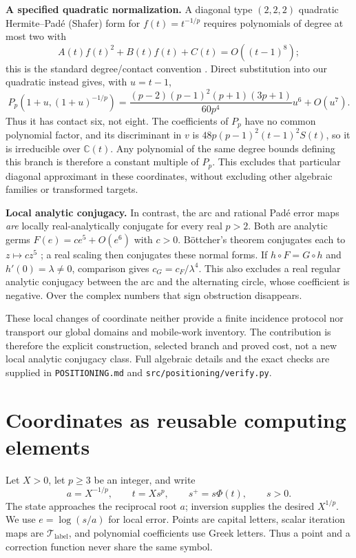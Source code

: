 \documentclass[11pt,a4paper]{article}
\newcommand{\map}[1]{\mathcal T_{\mathrm{#1}}}
\begin{document}
\textbf{A specified quadratic normalization.} A diagonal type $(2,2,2)$ quadratic Hermite--Pad\'e (Shafer) form for $f(t)=t^{-1/p}$ requires polynomials of degree at most two with
\[
 A(t)f(t)^2+B(t)f(t)+C(t)=O((t-1)^8);
\]
this is the standard degree/contact convention \cite[eqs.~(1.4)--(1.6)]{cabayLabahn1989}. Direct substitution into our quadratic instead gives, with $u=t-1$,
\[
 P_p(1+u,(1+u)^{-1/p})
 =\frac{(p-2)(p-1)^2(p+1)(3p+1)}{60p^4}u^6+O(u^7).
\]
Thus it has contact six, not eight. The coefficients of $P_p$ have no common polynomial factor, and its discriminant in $v$ is $48p(p-1)^2(t-1)^2S(t)$, so it is irreducible over $\mathbb C(t)$. Any polynomial of the same degree bounds defining this branch is therefore a constant multiple of $P_p$. This excludes that particular diagonal approximant in these coordinates, without excluding other algebraic families or transformed targets.

\textbf{Local analytic conjugacy.} In contrast, the arc and rational Pad\'e error maps \emph{are} locally real-analytically conjugate for every real $p>2$. Both are analytic germs $F(e)=c e^5+O(e^6)$ with $c>0$. B\"ottcher's theorem conjugates each to $z\mapsto c z^5$ \cite[Introduction]{buffEpsteinKoch2011}; a real scaling then conjugates these normal forms. If $h\circ F=G\circ h$ and $h'(0)=\lambda\ne0$, comparison gives $c_G=c_F/\lambda^4$. This also excludes a real regular analytic conjugacy between the arc and the alternating circle, whose coefficient is negative. Over the complex numbers that sign obstruction disappears.

These local changes of coordinate neither provide a finite incidence protocol nor transport our global domains and mobile-work inventory. The contribution is therefore the explicit construction, selected branch and proved cost, not a new local analytic conjugacy class. Full algebraic details and the exact checks are supplied in \texttt{POSITIONING.md} and \texttt{src/positioning/verify.py}.

\clearpage
\section{Coordinates as reusable computing elements}\label{sec:rails}
Let $X>0$, let $p\ge3$ be an integer, and write
\[
 a=X^{-1/p},\qquad t=Xs^p,\qquad s^+=s\Phi(t),\qquad s>0.
\]
The state approaches the reciprocal root $a$; inversion supplies the desired $X^{1/p}$. We use $e=\log(s/a)$ for local error. Points are capital letters, scalar iteration maps are $\map{label}$, and polynomial coefficients use Greek letters. Thus a point and a correction function never share the same symbol.
\end{document}
